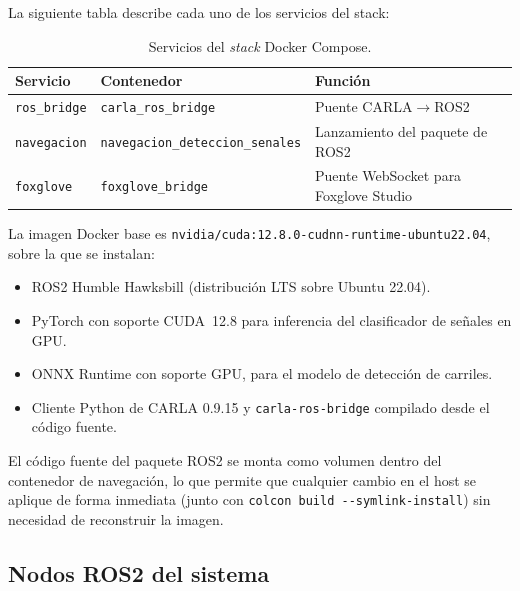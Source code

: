\documentclass[12pt, a4paper]{article}
\begin{document}
La siguiente tabla describe cada uno de los servicios del stack:

\begin{table}[H]
    \centering
    \caption{Servicios del \textit{stack} Docker Compose.}
    \label{tab:servicios_docker}
    \begin{tabular}{lll}
        \toprule
        \textbf{Servicio} & \textbf{Contenedor} & \textbf{Función} \\
        \midrule
        \texttt{ros\_bridge}  & \texttt{carla\_ros\_bridge}             & Puente CARLA$\to$ROS2 \\
        \texttt{navegacion}   & \texttt{navegacion\_deteccion\_senales} & Lanzamiento del paquete de ROS2 \\
        \texttt{foxglove}     & \texttt{foxglove\_bridge}               & Puente WebSocket para Foxglove Studio \\
        \bottomrule
    \end{tabular}
\end{table}

La imagen Docker base es \texttt{nvidia/cuda:12.8.0-cudnn-runtime-ubuntu22.04}, sobre la que se instalan:

\begin{itemize}
    \item ROS2 Humble Hawksbill (distribución LTS sobre Ubuntu 22.04).
    \item PyTorch con soporte CUDA~12.8 para inferencia del clasificador de señales en GPU.
    \item ONNX Runtime con soporte GPU, para el modelo de detección de carriles.
    \item Cliente Python de CARLA 0.9.15 y \texttt{carla-ros-bridge} compilado desde el código fuente.
\end{itemize}

El código fuente del paquete ROS2 se monta como volumen dentro del contenedor de navegación, lo que permite que cualquier cambio en el host se aplique de forma inmediata (junto con \texttt{colcon build -{}-symlink-install}) sin necesidad de reconstruir la imagen.

\subsection{Nodos ROS2 del sistema}
\end{document}
